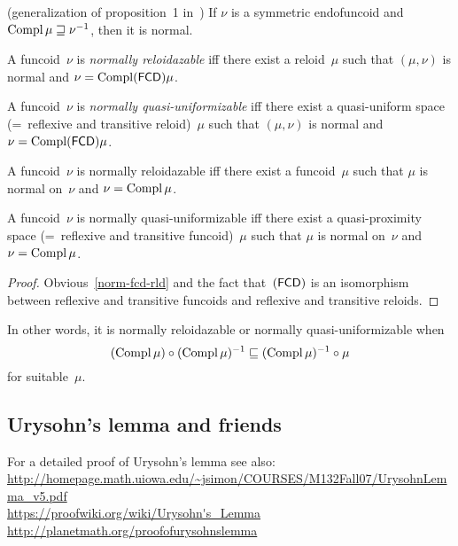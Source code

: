\begin{cor} (generalization of proposition~1 in~\cite{2014arXiv1410.1504B})
If $\nu$ is a symmetric endofuncoid and $\operatorname{Compl}\mu\sqsupseteq \nu^{-1}$, then it is normal.
\end{cor}

\begin{defn}
A funcoid~$\nu$ is \emph{normally reloidazable} iff there exist a reloid~$\mu$ such that
$(\mu,\nu)$ is normal and $\nu=\operatorname{Compl}(\mathsf{FCD})\mu$.
\end{defn}

\begin{defn}
A funcoid~$\nu$ is \emph{normally quasi-uniformizable} iff there exist a quasi-uniform space (=~reflexive and transitive reloid)~$\mu$ such that
$(\mu,\nu)$ is normal and $\nu=\operatorname{Compl}(\mathsf{FCD})\mu$.
\end{defn}

\begin{prop}
A funcoid~$\nu$ is normally reloidazable iff there exist a funcoid~$\mu$ such that
$\mu$ is normal on~$\nu$ and $\nu=\operatorname{Compl}\mu$.
\end{prop}

\begin{prop}
A funcoid~$\nu$ is normally quasi-uniformizable iff there exist a quasi-proximity space (=~reflexive and transitive funcoid)~$\mu$ such that
$\mu$ is normal on~$\nu$ and $\nu=\operatorname{Compl}\mu$.
\end{prop}

\begin{proof}
Obvious~\ref{norm-fcd-rld} and the fact that~$(\mathsf{FCD})$ is an isomorphism between reflexive and transitive funcoids
and reflexive and transitive reloids.
\end{proof}

In other words, it is normally reloidazable or normally quasi-uniformizable when
\[ (\operatorname{Compl}\mu)\circ(\operatorname{Compl}\mu)^{-1}\sqsubseteq(\operatorname{Compl}\mu)^{-1}\circ\mu \]
for suitable~$\mu$.

\subsection{Urysohn's lemma and friends}

For a detailed proof of Urysohn's lemma see also:\\
\url{http://homepage.math.uiowa.edu/~jsimon/COURSES/M132Fall07/UrysohnLemma_v5.pdf}\\
\url{https://proofwiki.org/wiki/Urysohn's_Lemma}\\
\url{http://planetmath.org/proofofurysohnslemma}

